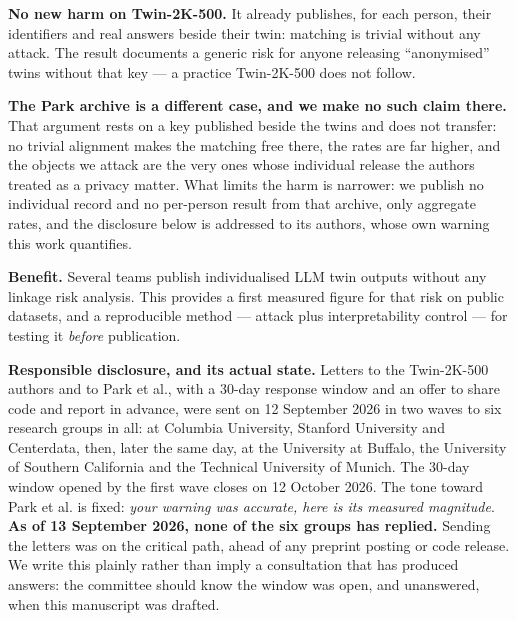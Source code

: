 \documentclass[sigconf,anonymous,review]{acmart}
\begin{document}
\begin{ethics}
\textbf{No new harm on Twin-2K-500.} It already publishes, for each person, their identifiers and real answers beside their twin: matching is trivial without any attack. The result documents a generic risk for anyone releasing ``anonymised'' twins without that key --- a practice Twin-2K-500 does not follow.

\textbf{The Park archive is a different case, and we make no such claim there.} That argument rests on a key published beside the twins and does not transfer: no trivial alignment makes the matching free there, the rates are far higher, and the objects we attack are the very ones whose individual release the authors treated as a privacy matter. What limits the harm is narrower: we publish no individual record and no per-person result from that archive, only aggregate rates, and the disclosure below is addressed to its authors, whose own warning this work quantifies.

\textbf{Benefit.} Several teams publish individualised LLM twin outputs without any linkage risk analysis. This provides a first measured figure for that risk on public datasets, and a reproducible method --- attack plus interpretability control --- for testing it \textit{before} publication.

\textbf{Responsible disclosure, and its actual state.} Letters to the Twin-2K-500 authors and to Park et al., with a 30-day response window and an offer to share code and report in advance, were sent on 12 September 2026 in two waves to six research groups in all: at Columbia University, Stanford University and Centerdata, then, later the same day, at the University at Buffalo, the University of Southern California and the Technical University of Munich. The 30-day window opened by the first wave closes on 12 October 2026. The tone toward Park et al. is fixed: \textit{your warning was accurate, here is its measured magnitude}. \textbf{As of 13 September 2026, none of the six groups has replied.} Sending the letters was on the critical path, ahead of any preprint posting or code release. We write this plainly rather than imply a consultation that has produced answers: the committee should know the window was open, and unanswered, when this manuscript was drafted.


\end{ethics}
\end{document}
